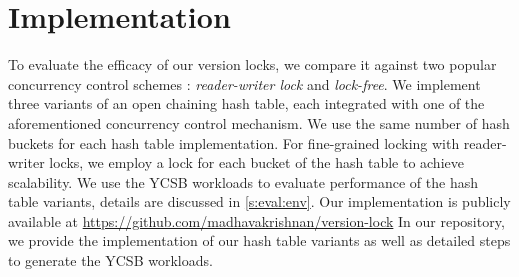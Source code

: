 \section{Implementation}
\label{s:impl}

To evaluate the efficacy of our version locks, we compare it against two popular
concurrency control schemes : \textit{reader-writer lock} and \textit{lock-free}.
We implement three variants of an open chaining hash table, each integrated with
one of the aforementioned concurrency control mechanism. We use the same number of
hash buckets for each hash table implementation. For fine-grained locking with
reader-writer locks, we employ a lock for each bucket of the hash table to achieve
scalability.
We use the YCSB workloads
to evaluate performance of the hash table variants, details are discussed in
\autoref{s:eval:env}. Our implementation is publicly available at
\url{https://github.com/madhavakrishnan/version-lock}
In our repository, we provide the implementation of our hash table variants
as well as detailed steps to generate the YCSB workloads.
